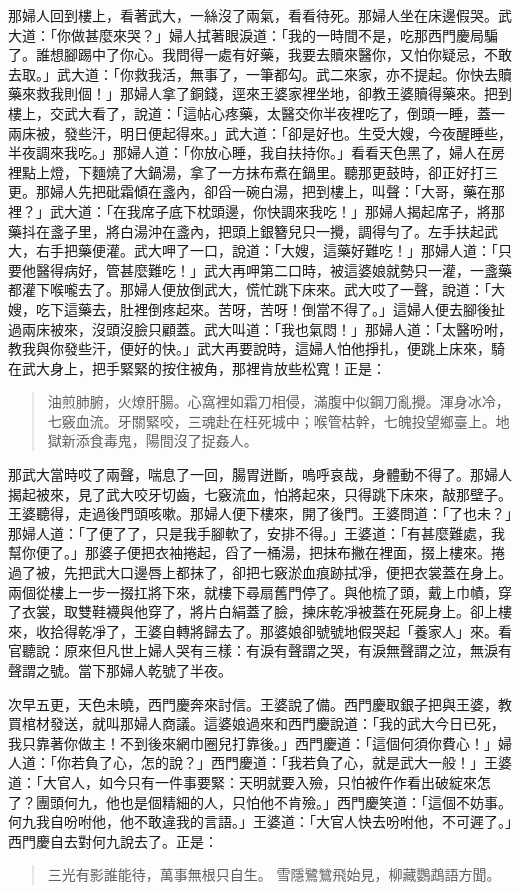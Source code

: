 那婦人回到樓上，看著武大，一絲沒了兩氣，看看待死。那婦人坐在床邊假哭。武大道：「你做甚麼來哭？」婦人拭著眼淚道：「我的一時間不是，吃那西門慶局騙了。誰想腳踢中了你心。我問得一處有好藥，我要去贖來醫你，又怕你疑忌，不敢去取。」武大道：「你救我活，無事了，一筆都勾。武二來家，亦不提起。你快去贖藥來救我則個！」那婦人拿了銅錢，逕來王婆家裡坐地，卻教王婆贖得藥來。把到樓上，交武大看了，說道：「這帖心疼藥，太醫交你半夜裡吃了，倒頭一睡，蓋一兩床被，發些汗，明日便起得來。」武大道：「卻是好也。生受大嫂，今夜醒睡些，半夜調來我吃。」那婦人道：「你放心睡，我自扶持你。」看看天色黑了，婦人在房裡點上燈，下麵燒了大鍋湯，拿了一方抹布煮在鍋里。聽那更鼓時，卻正好打三更。那婦人先把砒霜傾在盞內，卻舀一碗白湯，把到樓上，叫聲：「大哥，藥在那裡？」武大道：「在我席子底下枕頭邊，你快調來我吃！」那婦人揭起席子，將那藥抖在盞子里，將白湯沖在盞內，把頭上銀簪兒只一攪，調得勻了。左手扶起武大，右手把藥便灌。武大呷了一口，說道：「大嫂，這藥好難吃！」那婦人道：「只要他醫得病好，管甚麼難吃！」武大再呷第二口時，被這婆娘就勢只一灌，一盞藥都灌下喉嚨去了。那婦人便放倒武大，慌忙跳下床來。武大哎了一聲，說道：「大嫂，吃下這藥去，肚裡倒疼起來。苦呀，苦呀！倒當不得了。」這婦人便去腳後扯過兩床被來，沒頭沒臉只顧蓋。武大叫道：「我也氣悶！」那婦人道：「太醫吩咐，教我與你發些汗，便好的快。」武大再要說時，這婦人怕他掙扎，便跳上床來，騎在武大身上，把手緊緊的按住被角，那裡肯放些松寬！正是：
\begin{quote}
油煎肺腑，火燎肝腸。心窩裡如霜刀相侵，滿腹中似鋼刀亂攪。渾身冰冷，七竅血流。牙關緊咬，三魂赴在枉死城中；喉管枯幹，七魄投望鄉臺上。地獄新添食毒鬼，陽間沒了捉姦人。
\end{quote}

那武大當時哎了兩聲，喘息了一回，腸胃迸斷，嗚呼哀哉，身體動不得了。那婦人揭起被來，見了武大咬牙切齒，七竅流血，怕將起來，只得跳下床來，敲那壁子。王婆聽得，走過後門頭咳嗽。那婦人便下樓來，開了後門。王婆問道：「了也未？」那婦人道：「了便了了，只是我手腳軟了，安排不得。」王婆道：「有甚麼難處，我幫你便了。」那婆子便把衣袖捲起，舀了一桶湯，把抹布撇在裡面，掇上樓來。捲過了被，先把武大口邊唇上都抹了，卻把七竅淤血痕跡拭凈，便把衣裳蓋在身上。兩個從樓上一步一掇扛將下來，就樓下尋扇舊門停了。與他梳了頭，戴上巾幘，穿了衣裳，取雙鞋襪與他穿了，將片白絹蓋了臉，揀床乾凈被蓋在死屍身上。卻上樓來，收拾得乾凈了，王婆自轉將歸去了。那婆娘卻號號地假哭起「養家人」來。看官聽說：原來但凡世上婦人哭有三樣：有淚有聲謂之哭，有淚無聲謂之泣，無淚有聲謂之號。當下那婦人乾號了半夜。

次早五更，天色未曉，西門慶奔來討信。王婆說了備。西門慶取銀子把與王婆，教買棺材發送，就叫那婦人商議。這婆娘過來和西門慶說道：「我的武大今日已死，我只靠著你做主！不到後來網巾圈兒打靠後。」西門慶道：「這個何須你費心！」婦人道：「你若負了心，怎的說？」西門慶道：「我若負了心，就是武大一般！」王婆道：「大官人，如今只有一件事要緊：天明就要入殮，只怕被仵作看出破綻來怎了？團頭何九，他也是個精細的人，只怕他不肯殮。」西門慶笑道：「這個不妨事。何九我自吩咐他，他不敢違我的言語。」王婆道：「大官人快去吩咐他，不可遲了。」西門慶自去對何九說去了。正是：
\begin{quote}
三光有影誰能待，萬事無根只自生。
雪隱鷺鷥飛始見，柳藏鸚鵡語方聞。
\end{quote}
